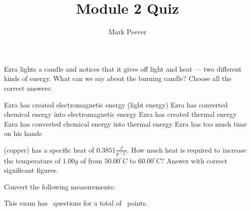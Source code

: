 \documentclass[11pt,addpoints]{exam}   	%
\title{Module 2 Quiz}
\author{Mark Peever}
\begin{document}
\maketitle

\pointsinrightmargin

\begin{center}
\end{center}
\vspace{0.1in}
\vspace{0.2in}

\begin{questions}
\question[5] Ezra lights a candle and notices that it gives off light and heat --- two different kinds of energy.
What can we say about the burning candle? Choose all the correct answers:

\begin{choices}
\choice Ezra has created electromagnetic energy (light energy)
\choice Ezra has converted chemical energy into electromagnetic energy
\choice Ezra has created thermal energy
\choice Ezra has converted chemical energy into thermal energy
\choice Ezra has too much time on his hands
\end{choices}


\question[5]
 (copper) has a specific heat of $0.3851 \frac{J}{g \cdot ^{\circ}C}$.
How much heat is required to increase the temperature of $1.00g$ of  from $50.00 ^{\circ}C$ to $60.00 ^{\circ}C$? 
Answer with correct significant figures. 



\question
Convert the following measurements:

\end{questions}

\begin{center}
This exam has \numquestions\ questions for a total of \numpoints\ points.
\end{center}
\end{document}
